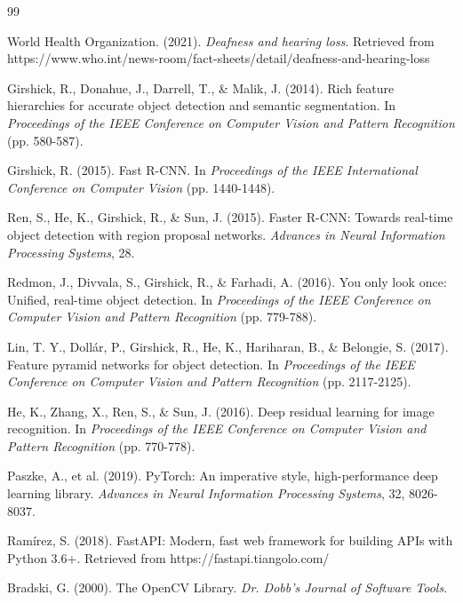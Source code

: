 \documentclass[12pt,a4paper]{article}
\begin{document}
\newpage
\begin{thebibliography}{99}

World Health Organization. (2021). \textit{Deafness and hearing loss}. Retrieved from https://www.who.int/news-room/fact-sheets/detail/deafness-and-hearing-loss

Girshick, R., Donahue, J., Darrell, T., \& Malik, J. (2014). Rich feature hierarchies for accurate object detection and semantic segmentation. In \textit{Proceedings of the IEEE Conference on Computer Vision and Pattern Recognition} (pp. 580-587).

Girshick, R. (2015). Fast R-CNN. In \textit{Proceedings of the IEEE International Conference on Computer Vision} (pp. 1440-1448).

Ren, S., He, K., Girshick, R., \& Sun, J. (2015). Faster R-CNN: Towards real-time object detection with region proposal networks. \textit{Advances in Neural Information Processing Systems}, 28.

Redmon, J., Divvala, S., Girshick, R., \& Farhadi, A. (2016). You only look once: Unified, real-time object detection. In \textit{Proceedings of the IEEE Conference on Computer Vision and Pattern Recognition} (pp. 779-788).

Lin, T. Y., Dollár, P., Girshick, R., He, K., Hariharan, B., \& Belongie, S. (2017). Feature pyramid networks for object detection. In \textit{Proceedings of the IEEE Conference on Computer Vision and Pattern Recognition} (pp. 2117-2125).

He, K., Zhang, X., Ren, S., \& Sun, J. (2016). Deep residual learning for image recognition. In \textit{Proceedings of the IEEE Conference on Computer Vision and Pattern Recognition} (pp. 770-778).

Paszke, A., et al. (2019). PyTorch: An imperative style, high-performance deep learning library. \textit{Advances in Neural Information Processing Systems}, 32, 8026-8037.

Ramírez, S. (2018). FastAPI: Modern, fast web framework for building APIs with Python 3.6+. Retrieved from https://fastapi.tiangolo.com/

Bradski, G. (2000). The OpenCV Library. \textit{Dr. Dobb's Journal of Software Tools}.

\end{thebibliography}
\end{document}
